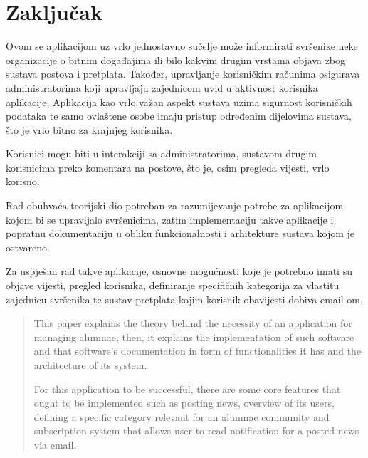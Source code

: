 \documentclass[zavrsni, numeric]{fer}
\begin{document}
\chapter{Zaključak}
Ovom se aplikacijom uz vrlo jednostavno sučelje može informirati svršenike neke organizacije o bitnim događajima ili bilo kakvim drugim vrstama objava zbog sustava postova i pretplata. Također, upravljanje korisničkim računima osigurava administratorima koji upravljaju zajednicom uvid u aktivnost korisnika aplikacije. Aplikacija kao vrlo važan aspekt sustava uzima sigurnost korisničkih podataka te samo ovlaštene osobe imaju pristup određenim dijelovima sustava, što je vrlo bitno za krajnjeg korisnika.

Korisnici mogu biti u interakciji sa administratorima, sustavom drugim korisnicima preko komentara na postove, što je, osim pregleda vijesti, vrlo korisno.




\begin{sazetak}
	Rad obuhvaća teorijski dio potreban za razumijevanje potrebe za aplikacijom kojom bi se upravljalo svršenicima, zatim implementaciju takve aplikacije i popratnu dokumentaciju u obliku funkcionalnosti i arhitekture sustava kojom je ostvareno.
		
	Za uspješan rad takve aplikacije, osnovne mogućnosti koje je potrebno imati su objave vijesti, pregled korisnika, definiranje specifičnih kategorija za vlastitu zajednicu svršenika te sustav pretplata kojim korisnik obavijesti dobiva email-om.
		
\end{sazetak}

\begin{abstract}
	This paper explains the theory behind the necessity of an application for managing alumnae, then, it explains the implementation of such software and that software's documentation in form of functionalities it has and the architecture of its system.
	
	For this application to be successful, there are some core features that ought to be implemented such as posting news, overview of its users, defining a specific category relevant for an alumnae community and subscription system that allows user to read notification for a posted news via email.
				
\end{abstract}
\end{document}
